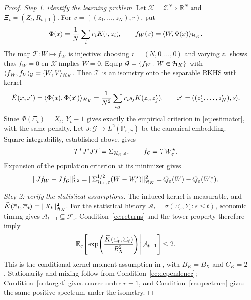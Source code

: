 \begin{proof}
\textit{Step 1: identify the learning problem.}
Let $\mathcal X=\mathscr Z^N\times\mathbb R^N$ and
$\Xi_t=(Z_t,R_{t+1})$. For $x=((z_1,\ldots,z_N),r)$, put
\[
\Phi(x)=\frac1N\sum_i r_iK(\cdot,z_i),
\qquad
f_W(x)=\langle W,\Phi(x)\rangle_{\mathcal{H}_K}.
\]
The map $\mathcal T:W\mapsto f_W$ is injective: choosing
$r=(N,0,\ldots,0)$ and varying $z_1$ shows that $f_W=0$ on
$\mathcal X$ implies $W=0$. Equip
$\mathcal G=\{f_W:W\in\mathcal{H}_K\}$ with
$\langle f_W,f_V\rangle_{\mathcal G}=\langle W,V\rangle_{\mathcal{H}_K}$.
Then $\mathcal T$ is an isometry onto the separable RKHS with kernel
\[
\widetilde K(x,x')
=\langle\Phi(x),\Phi(x')\rangle_{\mathcal{H}_K}
=\frac1{N^2}\sum_{i,j}r_i s_jK(z_i,z_j'),
\qquad x'=((z_1',\ldots,z_N'),s).
\]
Since $\Phi(\Xi_t)=X_t$, $Y_t\equiv1$ gives exactly the empirical
criterion in \eqref{eq:estimator}, with the same penalty.
Let $J:\mathcal G\to L^2(\mathbb P_{\varepsilon,\Xi})$ be the canonical
embedding. Square integrability, established above, gives
\[
\mathcal T^*J^*J\mathcal T=\Sigma_{\mathcal{H}_K,\varepsilon},
\qquad
f_{\mathcal G}=\mathcal TW^\star_\varepsilon.
\]
Expansion of the population criterion at its minimizer gives
\[
\|Jf_W-Jf_{\mathcal G}\|_{L^2}^2
=\|\Sigma_{\mathcal{H}_K,\varepsilon}^{1/2}(W-W^\star_\varepsilon)\|_{\mathcal{H}_K}^2
=Q_\varepsilon(W)-Q_\varepsilon(W^\star_\varepsilon).
\]

\medskip
\noindent\textit{Step 2: verify the statistical assumptions.}
The induced kernel is measurable, and
$\widetilde K(\Xi_t,\Xi_t)=\|X_t\|_{\mathcal{H}_K}^2$.
For the statistical history
$\mathcal A_t=\sigma(\Xi_s,Y_s:s\leq t)$, economic timing gives
$\mathcal A_{t-1}\subseteq\mathscr F_t$.
Condition~\ref{ec:returns} and the tower property therefore imply
\[
\mathbb{E}_\varepsilon\!\left[
\left.\exp\!\left(\frac{\widetilde K(\Xi_t,\Xi_t)}{B_X^2}\right)
\right|\mathcal A_{t-1}\right]\leq2.
\]
This is the conditional kernel-moment assumption in
\citet{bignozzigagliardinischneider2026}, with $B_K=B_X$ and $C_K=2$.
Stationarity and mixing follow from Condition~\ref{ec:dependence};
Condition~\ref{ec:target} gives source order $r=1$, and
Condition~\ref{ec:spectrum} gives the same positive spectrum under the isometry.


\end{proof}
